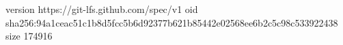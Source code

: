 version https://git-lfs.github.com/spec/v1
oid sha256:94a1ceac51c1b8d5fcc5b6d92377b621b85442e02568ee6b2c5c98c533922438
size 174916
